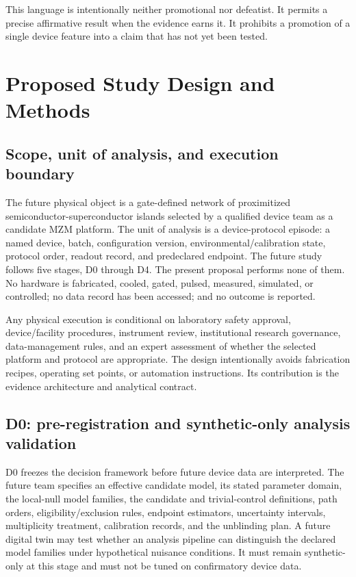 \documentclass[conference]{IEEEtran}
\begin{document}
This language is intentionally neither promotional nor defeatist. It permits a precise affirmative result when the evidence earns it. It prohibits a promotion of a single device feature into a claim that has not yet been tested.

\section{Proposed Study Design and Methods}

\subsection{Scope, unit of analysis, and execution boundary}

The future physical object is a gate-defined network of proximitized semiconductor-superconductor islands selected by a qualified device team as a candidate MZM platform. The unit of analysis is a device-protocol episode: a named device, batch, configuration version, environmental/calibration state, protocol order, readout record, and predeclared endpoint. The future study follows five stages, D0 through D4. The present proposal performs none of them. No hardware is fabricated, cooled, gated, pulsed, measured, simulated, or controlled; no data record has been accessed; and no outcome is reported.

Any physical execution is conditional on laboratory safety approval, device/facility procedures, instrument review, institutional research governance, data-management rules, and an expert assessment of whether the selected platform and protocol are appropriate. The design intentionally avoids fabrication recipes, operating set points, or automation instructions. Its contribution is the evidence architecture and analytical contract.

\subsection{D0: pre-registration and synthetic-only analysis validation}

D0 freezes the decision framework before future device data are interpreted. The future team specifies an effective candidate model, its stated parameter domain, the local-null model families, the candidate and trivial-control definitions, path orders, eligibility/exclusion rules, endpoint estimators, uncertainty intervals, multiplicity treatment, calibration records, and the unblinding plan. A future digital twin may test whether an analysis pipeline can distinguish the declared model families under hypothetical nuisance conditions. It must remain synthetic-only at this stage and must not be tuned on confirmatory device data.
\end{document}
